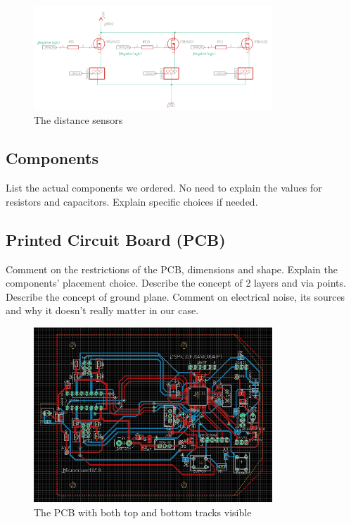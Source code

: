 \begin{figure}[htb]
    \centering
    \includegraphics[width=0.8\textwidth]{figures/hardware/DistanceSensors.PNG}
    \caption{The distance sensors}
    \label{fig:sensors}
\end{figure}

\FloatBarrier



\subsection{Components}

List the actual components we ordered.
No need to explain the values for resistors and capacitors.
Explain specific choices if needed.


\subsection{Printed Circuit Board (PCB)}

Comment on the restrictions of the PCB, dimensions and shape.
Explain the components' placement choice.
Describe the concept of 2 layers and via points.
Describe the concept of ground plane.
Comment on electrical noise, its sources and why it doesn't really matter in our case.

\begin{figure}[htb]
    \centering
    \includegraphics[width=0.8\textwidth]{figures/hardware/PCB.PNG}
    \caption{The PCB with both top and bottom tracks visible}
    \label{fig:pcb}
\end{figure}

